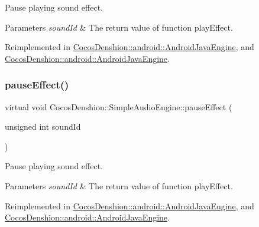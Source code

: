 Pause playing sound effect.


\begin{DoxyParams}{Parameters}
{\em sound\+Id} & The return value of function play\+Effect. \\
\hline
\end{DoxyParams}


Reimplemented in \hyperlink{classCocosDenshion_1_1android_1_1AndroidJavaEngine_ad6ad4348ecf5003e359ec7beb79475b6}{Cocos\+Denshion\+::android\+::\+Android\+Java\+Engine}, and \hyperlink{classCocosDenshion_1_1android_1_1AndroidJavaEngine_a6fae84fc04d9e8ae2e38684f616df9e9}{Cocos\+Denshion\+::android\+::\+Android\+Java\+Engine}.

\mbox{\label{classCocosDenshion_1_1SimpleAudioEngine_a112e442e3a4dcc8e2018a516bf214e3c}} 
\subsubsection{\texorpdfstring{pause\+Effect()}{pauseEffect()}\hspace{0.1cm}{\footnotesize\ttfamily [2/2]}}
{\footnotesize\ttfamily virtual void Cocos\+Denshion\+::\+Simple\+Audio\+Engine\+::pause\+Effect (\begin{DoxyParamCaption}\item[{unsigned int}]{sound\+Id }\end{DoxyParamCaption})\hspace{0.3cm}{\ttfamily [virtual]}}

Pause playing sound effect.


\begin{DoxyParams}{Parameters}
{\em sound\+Id} & The return value of function play\+Effect. \\
\hline
\end{DoxyParams}


Reimplemented in \hyperlink{classCocosDenshion_1_1android_1_1AndroidJavaEngine_ad6ad4348ecf5003e359ec7beb79475b6}{Cocos\+Denshion\+::android\+::\+Android\+Java\+Engine}, and \hyperlink{classCocosDenshion_1_1android_1_1AndroidJavaEngine_a6fae84fc04d9e8ae2e38684f616df9e9}{Cocos\+Denshion\+::android\+::\+Android\+Java\+Engine}.

\mbox{\label{classCocosDenshion_1_1SimpleAudioEngine_a579246d2298b943adf49a2c4faaf25ea}} 
